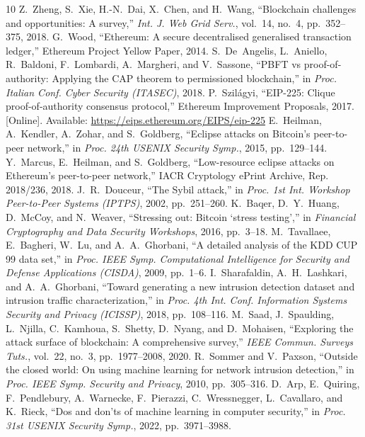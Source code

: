 \documentclass[journal]{IEEEtran}
\begin{document}

\begin{thebibliography}{10}
 Z.~Zheng, S.~Xie, H.-N.~Dai, X.~Chen, and H.~Wang, ``Blockchain challenges and opportunities: A survey,'' \emph{Int. J. Web Grid Serv.}, vol.~14, no.~4, pp.~352--375, 2018.
 G.~Wood, ``Ethereum: A secure decentralised generalised transaction ledger,'' Ethereum Project Yellow Paper, 2014.
 S.~De~Angelis, L.~Aniello, R.~Baldoni, F.~Lombardi, A.~Margheri, and V.~Sassone, ``PBFT vs proof-of-authority: Applying the CAP theorem to permissioned blockchain,'' in \emph{Proc. Italian Conf. Cyber Security (ITASEC)}, 2018.
 P.~Szil\'agyi, ``EIP-225: Clique proof-of-authority consensus protocol,'' Ethereum Improvement Proposals, 2017. [Online]. Available: \url{https://eips.ethereum.org/EIPS/eip-225}
 E.~Heilman, A.~Kendler, A.~Zohar, and S.~Goldberg, ``Eclipse attacks on Bitcoin's peer-to-peer network,'' in \emph{Proc. 24th USENIX Security Symp.}, 2015, pp.~129--144.
 Y.~Marcus, E.~Heilman, and S.~Goldberg, ``Low-resource eclipse attacks on Ethereum's peer-to-peer network,'' IACR Cryptology ePrint Archive, Rep. 2018/236, 2018.
 J.~R.~Douceur, ``The Sybil attack,'' in \emph{Proc. 1st Int. Workshop Peer-to-Peer Systems (IPTPS)}, 2002, pp.~251--260.
 K.~Baqer, D.~Y.~Huang, D.~McCoy, and N.~Weaver, ``Stressing out: Bitcoin `stress testing','' in \emph{Financial Cryptography and Data Security Workshops}, 2016, pp.~3--18.
 M.~Tavallaee, E.~Bagheri, W.~Lu, and A.~A.~Ghorbani, ``A detailed analysis of the KDD CUP 99 data set,'' in \emph{Proc. IEEE Symp. Computational Intelligence for Security and Defense Applications (CISDA)}, 2009, pp.~1--6.
 I.~Sharafaldin, A.~H.~Lashkari, and A.~A.~Ghorbani, ``Toward generating a new intrusion detection dataset and intrusion traffic characterization,'' in \emph{Proc. 4th Int. Conf. Information Systems Security and Privacy (ICISSP)}, 2018, pp.~108--116.
 M.~Saad, J.~Spaulding, L.~Njilla, C.~Kamhoua, S.~Shetty, D.~Nyang, and D.~Mohaisen, ``Exploring the attack surface of blockchain: A comprehensive survey,'' \emph{IEEE Commun. Surveys Tuts.}, vol.~22, no.~3, pp.~1977--2008, 2020.
 R.~Sommer and V.~Paxson, ``Outside the closed world: On using machine learning for network intrusion detection,'' in \emph{Proc. IEEE Symp. Security and Privacy}, 2010, pp.~305--316.
 D.~Arp, E.~Quiring, F.~Pendlebury, A.~Warnecke, F.~Pierazzi, C.~Wressnegger, L.~Cavallaro, and K.~Rieck, ``Dos and don'ts of machine learning in computer security,'' in \emph{Proc. 31st USENIX Security Symp.}, 2022, pp.~3971--3988.

\end{thebibliography}
\end{document}
